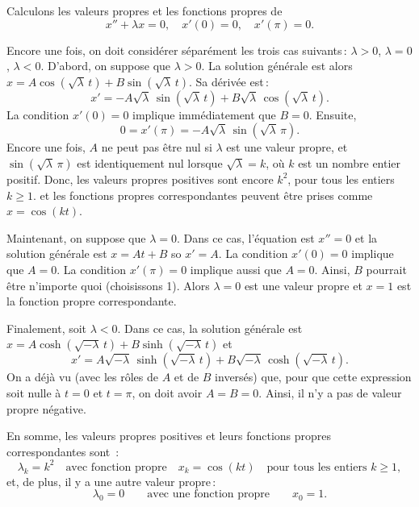 \begin{example}
Calculons les valeurs propres et les fonctions propres de 
\begin{equation*}
x'' + \lambda x = 0, \quad x'(0) = 0, \quad x'(\pi) = 0 .
\end{equation*}

Encore une fois, on doit considérer séparément  les trois cas suivants\,: $\lambda > 0$, $\lambda = 0$, $\lambda
< 0$.
D'abord, on suppose que $\lambda > 0$.
La solution générale est alors 
$x = A \cos ( \sqrt{\lambda}\, t) + B \sin ( \sqrt{\lambda}\, t)$.  Sa dérivée est\,: 
\begin{equation*}
x' = -A\sqrt{\lambda}\, \sin ( \sqrt{\lambda}\, t) + B\sqrt{\lambda}\,
\cos (\sqrt{\lambda}\, t) .
\end{equation*}
La condition $x'(0) = 0$ implique immédiatement que  $B = 0$.
Ensuite,
\begin{equation*}
0 = x'(\pi) = -A\sqrt{\lambda}\, \sin ( \sqrt{\lambda}\, \pi) .
\end{equation*}
Encore une fois,  $A$ ne peut pas être nul si  $\lambda$ est une valeur propre, et $\sin ( \sqrt{\lambda}\, \pi)$ est identiquement nul lorsque
$\sqrt{\lambda} = k$,  où $k$ est un nombre entier positif.
Donc, les valeurs propres positives sont encore 
$k^2$, pour tous les entiers $k \geq 1$.  et les fonctions propres correspondantes peuvent être prises comme  $x=\cos (k t)$.

Maintenant, on suppose que  $\lambda = 0$.  Dans ce cas, l'équation est $x'' = 0$
et la solution générale est $x = At + B$ so $x' = A$.  La condition 
$x'(0) = 0$ implique que 
$A=0$.  La condition $x'(\pi) = 0$ implique aussi que  $A=0$.
Ainsi, $B$ pourrait être n'importe quoi (choisissons 1). Alors  $\lambda = 0$
est une valeur propre et $x=1$ est la fonction propre correspondante. 

Finalement, soit $\lambda < 0$.  Dans ce cas, la solution générale est 
$x = A \cosh ( \sqrt{-\lambda}\, t) + B \sinh ( \sqrt{-\lambda}\, t)$
et
\begin{equation*}
x' = A\sqrt{-\lambda}\, \sinh ( \sqrt{-\lambda}\, t)
+ B\sqrt{-\lambda}\, \cosh ( \sqrt{-\lambda}\, t ) .
\end{equation*}
On a déjà vu (avec les rôles de  $A$ et de $B$ inversés) que, pour que cette expression soit  nulle à $t=0$ et $t=\pi$, on doit avoir $A=B=0$. Ainsi, il n'y a pas de valeur propre négative. 

En somme, les valeurs propres positives et leurs fonctions propres correspondantes sont \,:
\begin{equation*}
\lambda_k = k^2 \quad \text{avec fonction propre} \quad x_k = \cos (k t)
\quad \text{pour tous les entiers } k \geq 1 ,
\end{equation*}
et, de plus, il y a une autre valeur propre\,: 
\begin{equation*}
\lambda_0 = 0 \qquad \text{avec une fonction propre} \qquad x_0 = 1.
\end{equation*}
\end{example}

